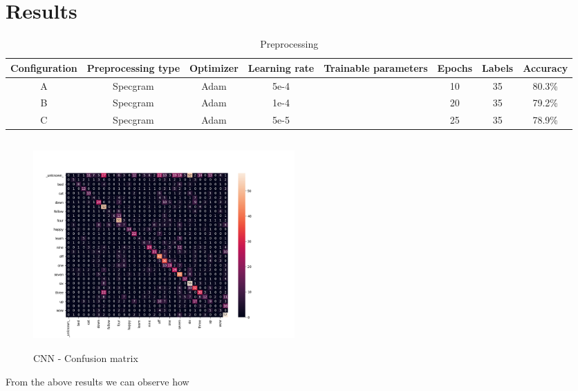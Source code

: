 
\section{Results}
\label{sec:results}

\begin{table}[ht]
	\centering
	\begin{tabular}{|c c c c c c c c|}
		\hline
		Configuration & Preprocessing type & Optimizer & Learning rate & Trainable parameters & Epochs  & Labels & Accuracy \\
		\hline
		A &Specgram&Adam&5e-4&&10&35&80.3\% \\
		B &Specgram&Adam&1e-4&&20&35&79.2\% \\
		C &Specgram&Adam&5e-5&&25&35&78.9\% \\
		\hline
	\end{tabular}
	\caption{Preprocessing}
	\label{table:Pr_eprocessing}
\end{table}

\begin{figure}[h]
			\centering
	    	\includegraphics[width=10cm, height=8cm]{conf_matrix_cnn_dii_cm}
	    	\caption{CNN - Confusion matrix}
	    	\label{fig:conf_matrix_cnn}
\end{figure} 

\noindent From the above results we can observe how {}